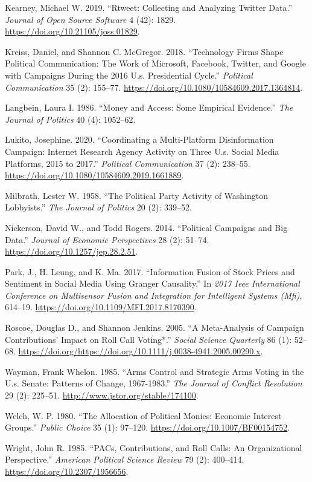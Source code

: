 \documentclass[12pt,]{article}
\begin{document}
\leavevmode\hypertarget{ref-rtweet}{}%
Kearney, Michael W. 2019. ``Rtweet: Collecting and Analyzing Twitter
Data.'' \emph{Journal of Open Source Software} 4 (42): 1829.
\url{https://doi.org/10.21105/joss.01829}.

\leavevmode\hypertarget{ref-kreiss2018}{}%
Kreiss, Daniel, and Shannon C. McGregor. 2018. ``Technology Firms Shape
Political Communication: The Work of Microsoft, Facebook, Twitter, and
Google with Campaigns During the 2016 U.s. Presidential Cycle.''
\emph{Political Communication} 35 (2): 155--77.
\url{https://doi.org/10.1080/10584609.2017.1364814}.

\leavevmode\hypertarget{ref-langbein1986}{}%
Langbein, Laura I. 1986. ``Money and Access: Some Empirical Evidence.''
\emph{The Journal of Politics} 40 (4): 1052--62.

\leavevmode\hypertarget{ref-lukito2020}{}%
Lukito, Josephine. 2020. ``Coordinating a Multi-Platform Disinformation
Campaign: Internet Research Agency Activity on Three U.s. Social Media
Platforms, 2015 to 2017.'' \emph{Political Communication} 37 (2):
238--55. \url{https://doi.org/10.1080/10584609.2019.1661889}.

\leavevmode\hypertarget{ref-milbrath1958}{}%
Milbrath, Lester W. 1958. ``The Political Party Activity of Washington
Lobbyists.'' \emph{The Journal of Politics} 20 (2): 339--52.

\leavevmode\hypertarget{ref-nickerson2014}{}%
Nickerson, David W., and Todd Rogers. 2014. ``Political Campaigns and
Big Data.'' \emph{Journal of Economic Perspectives} 28 (2): 51--74.
\url{https://doi.org/10.1257/jep.28.2.51}.

\leavevmode\hypertarget{ref-park2017}{}%
Park, J., H. Leung, and K. Ma. 2017. ``Information Fusion of Stock
Prices and Sentiment in Social Media Using Granger Causality.'' In
\emph{2017 Ieee International Conference on Multisensor Fusion and
Integration for Intelligent Systems (Mfi)}, 614--19.
\url{https://doi.org/10.1109/MFI.2017.8170390}.

\leavevmode\hypertarget{ref-roscoe2005}{}%
Roscoe, Douglas D., and Shannon Jenkins. 2005. ``A Meta-Analysis of
Campaign Contributions' Impact on Roll Call Voting*.'' \emph{Social
Science Quarterly} 86 (1): 52--68.
\url{https://doi.org/https://doi.org/10.1111/j.0038-4941.2005.00290.x}.

\leavevmode\hypertarget{ref-wayman1985}{}%
Wayman, Frank Whelon. 1985. ``Arms Control and Strategic Arms Voting in
the U.s. Senate: Patterns of Change, 1967-1983.'' \emph{The Journal of
Conflict Resolution} 29 (2): 225--51.
\url{http://www.jstor.org/stable/174100}.

\leavevmode\hypertarget{ref-welch1980}{}%
Welch, W. P. 1980. ``The Allocation of Political Monies: Economic
Interest Groups.'' \emph{Public Choice} 35 (1): 97--120.
\url{https://doi.org/10.1007/BF00154752}.

\leavevmode\hypertarget{ref-wright1985}{}%
Wright, John R. 1985. ``PACs, Contributions, and Roll Calls: An
Organizational Perspective.'' \emph{American Political Science Review}
79 (2): 400--414. \url{https://doi.org/10.2307/1956656}.





\newpage
\singlespacing 
\end{document}
